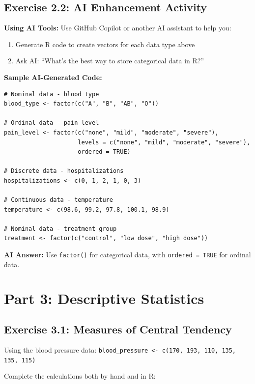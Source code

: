 \documentclass[11pt]{article}
\begin{document}
\subsection{Exercise 2.2: AI Enhancement Activity}
\begin{tcolorbox}[colback=aiblue!10,colframe=aiblue,boxrule=1pt,arc=2pt,left=6pt,right=6pt,top=6pt,bottom=6pt]
\textbf{\textcolor{aiblue}{Using AI Tools:}} Use GitHub Copilot or another AI assistant to help you:

\begin{enumerate}
\item Generate R code to create vectors for each data type above
\item Ask AI: ``What's the best way to store categorical data in R?''
\end{enumerate}

\textbf{Sample AI-Generated Code:}
\begin{lstlisting}
# Nominal data - blood type
blood_type <- factor(c("A", "B", "AB", "O"))

# Ordinal data - pain level
pain_level <- factor(c("none", "mild", "moderate", "severe"),
                     levels = c("none", "mild", "moderate", "severe"),
                     ordered = TRUE)

# Discrete data - hospitalizations
hospitalizations <- c(0, 1, 2, 1, 0, 3)

# Continuous data - temperature
temperature <- c(98.6, 99.2, 97.8, 100.1, 98.9)

# Nominal data - treatment group
treatment <- factor(c("control", "low dose", "high dose"))
\end{lstlisting}

\textbf{AI Answer:} Use \texttt{factor()} for categorical data, with \texttt{ordered = TRUE} for ordinal data.
\end{tcolorbox}

\newpage
\section{Part 3: Descriptive Statistics}

\subsection{Exercise 3.1: Measures of Central Tendency}
Using the blood pressure data: \texttt{blood\_pressure <- c(170, 193, 110, 135, 135, 115)}

Complete the calculations both by hand and in R:
\end{document}
